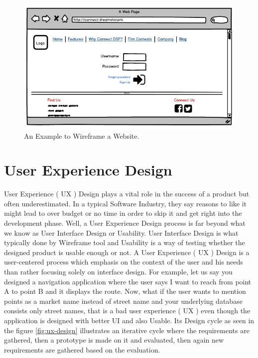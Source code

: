 \begin{figure}[hbt!]
	\centering
	\includegraphics[width=\linewidth]{figures/Connect_DSP}
	\caption{An Example to Wireframe a Website.\cite{B}}
	\label{fig:wireframe_website}
\end{figure}

\section{User Experience Design} 
\label{sec:uxd}

User Experience ( UX ) Design plays a vital role in the success of a product but often underestimated. In a typical Software Industry, they say reasons to like it might lead to over budget or no time in order to skip it and get right into the development phase. Well, a User Experience Design process is far beyond what we know as User Interface Design or Usability.  User Interface Design is what typically done by Wireframe tool and Usability is a way of testing whether the designed product is usable enough or not. A User Experience ( UX ) Design is a user-centered process which emphasis on the context of the user and his needs than rather focusing solely on interface design. \cite{UX} For example, let us say you designed a navigation application where the user says I want to reach from point A to point B and it displays the route. Now, what if the user wants to mention points as a market name instead of street name and your underlying database consists only street names, that is a bad user experience ( UX ) even though the application is designed with better UI and also Usable. Its Design \cite{UXD} cycle as seen in the figure \ref{fig:ux-design} illustrates an iterative cycle where the requirements are gathered, then a prototype is made on it and evaluated, then again new requirements are gathered based on the evaluation. \\ \\

